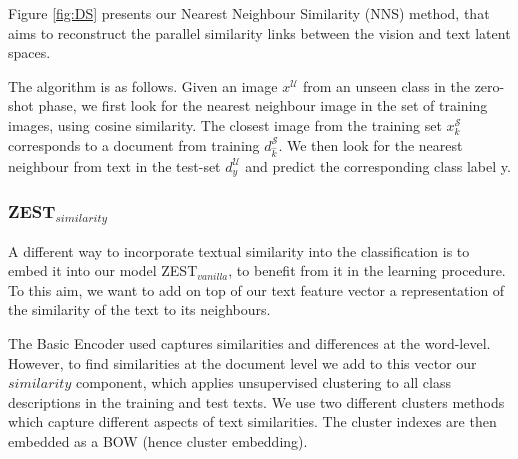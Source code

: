 \documentclass[11pt,a4paper]{article}
\newcommand\yuval[1]{\textcolor{darkpink}{\textbf{YUVAL:} #1 }}
\newcommand\reut[1]{\textcolor{green}{\textbf{REUT:} #1 }}
\begin{document}
Figure \ref{fig:DS} presents our Nearest Neighbour Similarity (NNS) method, that aims to  reconstruct  the parallel similarity links between the  vision and text latent spaces. 


The algorithm is as follows. Given an image $x^{\mathcal{U}}$ from an unseen class in the zero-shot phase,
we first look for the nearest neighbour image in the set of training images, using cosine similarity. The closest image from the training set $x^{\mathcal{S}}_k$ corresponds to a document from training $d^{\mathcal{S}}_{\hat{k}}$. We then look for the nearest neighbour from text in the test-set $d^{\mathcal{U}}_y$ and predict the corresponding class label y.
 

\subsubsection{ZEST$_{similarity}$}
\label{section:similarity_component}

A different way to incorporate textual similarity into the classification is to embed it into our model ZEST$_{vanilla}$, to benefit from it in the learning procedure. To this aim, we want to add on top of our text feature vector a representation of the similarity of the text to its neighbours.  \par


The Basic Encoder used captures similarities and differences at the word-level. However, to find similarities at the document level we add to this vector our $similarity$ component, %
which applies unsupervised clustering to all class descriptions in the training and test texts. We use two different clusters methods which capture different aspects of text similarities. The cluster indexes are then embedded as a BOW (hence cluster embedding). \par
\end{document}
